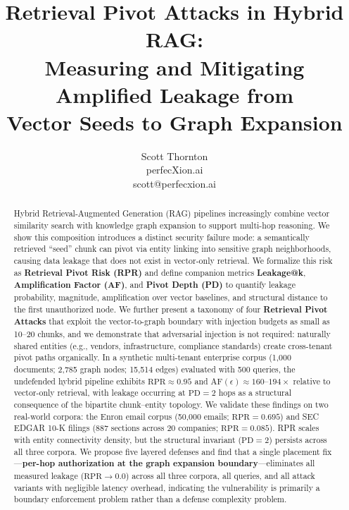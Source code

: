 \documentclass[letterpaper,twocolumn,10pt]{article}
\begin{document}
\date{}

\title{\Large \bf Retrieval Pivot Attacks in Hybrid RAG:\\
Measuring and Mitigating Amplified Leakage from\\
Vector Seeds to Graph Expansion}

\author{
{\rm Scott Thornton}\\
perfecXion.ai\\
scott@perfecxion.ai
}

\maketitle

\begin{abstract}
Hybrid Retrieval-Augmented Generation (RAG) pipelines increasingly
combine vector similarity search with knowledge graph expansion to
support multi-hop reasoning. We show this composition introduces a
distinct security failure mode: a semantically retrieved ``seed'' chunk
can pivot via entity linking into sensitive graph neighborhoods,
causing data leakage that does not exist in vector-only retrieval. We
formalize this risk as \textbf{Retrieval Pivot Risk (RPR)} and define
companion metrics \textbf{Leakage@k}, \textbf{Amplification Factor
(AF)}, and \textbf{Pivot Depth (PD)} to quantify leakage probability,
magnitude, amplification over vector baselines, and structural distance
to the first unauthorized node. We further present a taxonomy of four
\textbf{Retrieval Pivot Attacks} that exploit the vector-to-graph
boundary with injection budgets as small as 10--20 chunks, and we
demonstrate that adversarial injection is not required: naturally
shared entities (e.g., vendors, infrastructure, compliance standards)
create cross-tenant pivot paths organically. In a synthetic
multi-tenant enterprise corpus (1{,}000 documents; 2{,}785 graph
nodes; 15{,}514 edges) evaluated with 500 queries, the undefended
hybrid pipeline exhibits $\text{RPR} \approx 0.95$ and
$\text{AF}(\epsilon) \approx 160\text{--}194\times$ relative to
vector-only retrieval, with leakage occurring at $\text{PD} = 2$ hops
as a structural consequence of the bipartite chunk--entity topology.
We validate these findings on two real-world corpora: the Enron email
corpus (50{,}000 emails; $\text{RPR} = 0.695$) and SEC EDGAR 10-K
filings (887 sections across 20 companies; $\text{RPR} = 0.085$).
RPR scales with entity connectivity density, but the structural
invariant ($\text{PD} = 2$) persists across all three corpora.
We propose five layered defenses and find that a single placement
fix---\textbf{per-hop authorization at the graph expansion
boundary}---eliminates all measured leakage ($\text{RPR} \to 0.0$)
across all three corpora, all queries, and all attack variants with
negligible latency overhead, indicating the vulnerability is primarily
a boundary enforcement problem rather than a defense complexity
problem.
\end{abstract}
\end{document}
